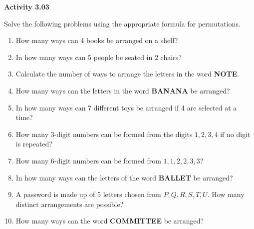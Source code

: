 \vspace{0.3ex}
\noindent\textbf{Activity 3.03}

\vspace{0.2ex}

Solve the following problems using the appropriate formula for permutations.

\begin{enumerate}[label=\color{blue}\arabic*.]
    \item How many ways can 4 books be arranged on a shelf?
    \item In how many ways can 5 people be seated in 2 chairs?
    \item Calculate the number of ways to arrange the letters in the word \textbf{NOTE}.
    \item How many ways can the letters in the word \textbf{BANANA} be arranged?
    \item In how many ways can 7 different toys be arranged if 4 are selected at a time?
    \item How many 3-digit numbers can be formed from the digits \(1, 2, 3, 4\) if no digit is repeated?
    \item How many 6-digit numbers can be formed from \(1, 1, 2, 2, 3, 3\)?
    \item In how many ways can the letters of the word \textbf{BALLET} be arranged?
    \item A password is made up of 5 letters chosen from \(P, Q, R, S, T, U\). How many distinct arrangements are possible?
    \item How many ways can the word \textbf{COMMITTEE} be arranged?
\end{enumerate}
